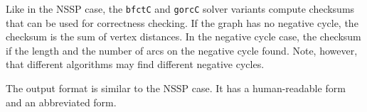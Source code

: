 \documentclass[11pt]{article}
\begin{document}
Like in the NSSP case, the {\tt bfctC} and {\tt gorcC} solver variants
compute checksums that can be used for correctness checking. If the
graph has no negative cycle, the checksum is the sum of vertex
distances. In the negative cycle case, the checksum if the length and
the number of arcs on the negative cycle found. Note, however, that
different algorithms may find different negative cycles.

The output format is similar to the NSSP case. It has a human-readable
form and an abbreviated form.
\end{document}
